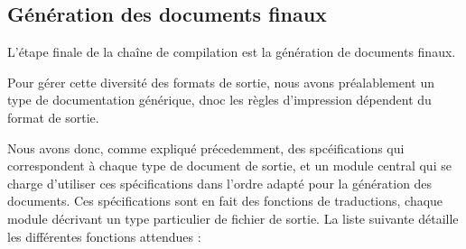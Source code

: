 \documentclass[a4paper, 11pt]{report}
\begin{document}
    \subsection{Génération des documents finaux}
    L'étape finale de la chaîne de compilation est la génération de documents
    finaux.

    Pour gérer cette diversité des formats de sortie, nous avons préalablement
    un type de documentation générique, dnoc les règles d'impression dépendent
    du format de sortie.

    Nous avons donc, comme expliqué précedemment, des spcéifications qui
    correspondent à chaque type de document de sortie, et un module central
    qui se charge d'utiliser ces spécifications dans l'ordre adapté pour la
    génération des documents. Ces spécifications sont en fait des fonctions
    de traductions, chaque module décrivant un type particulier de fichier
    de sortie. La liste suivante détaille les différentes fonctions
    attendues :
\end{document}
